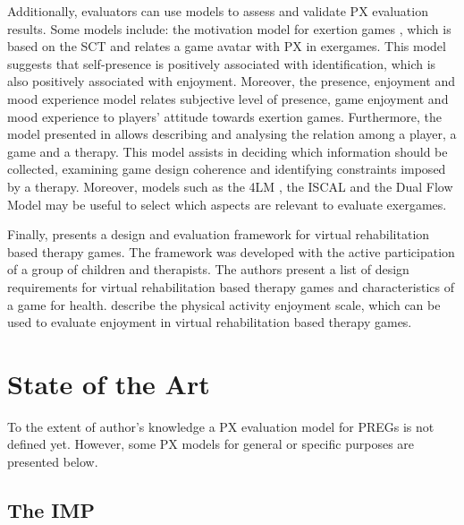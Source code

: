 Additionally, evaluators can use models to assess and validate PX evaluation results. Some models include: the motivation model for exertion games \autocite{Li2016}, which is based on the \ac{SCT} and relates a game avatar with \ac{PX} in exergames. This model suggests that self-presence is positively associated with identification, which is also positively associated with enjoyment. Moreover, the presence, enjoyment and mood experience model \autocite{Ho2017} relates subjective level of presence, game enjoyment and mood experience to players' attitude towards exertion games. Furthermore, the model presented in \autocite{Mader2012} allows describing and analysing the relation among a player, a game and a therapy. This model assists in deciding which information should be collected, examining game design coherence and identifying constraints imposed by a therapy. Moreover, models such as the \ac{4LM} \autocite{Mueller2011}, the \ac{ISCAL} \autocite{Zhang2011} and the Dual Flow Model \autocite{Sinclair2007} may be useful to select which aspects are relevant to evaluate exergames.

Finally, \textcite{Ni2014} presents a design and evaluation framework for virtual rehabilitation based therapy games. The framework was developed with the active participation of a group of children and therapists. The authors present a list of design requirements for virtual rehabilitation based therapy games and characteristics of a game for health. \textcite{kendzierski1991physical} describe the physical activity enjoyment scale, which can be used to evaluate enjoyment in virtual rehabilitation based therapy games.


\section{State of the Art}
\label{sec:ox_ux_models}

To the extent of author's knowledge a \ac{PX} evaluation model for \acp{PREG} is not defined yet. However, some \ac{PX} models for general or specific purposes are presented below.

\subsection{The \ac{IMP}} 

